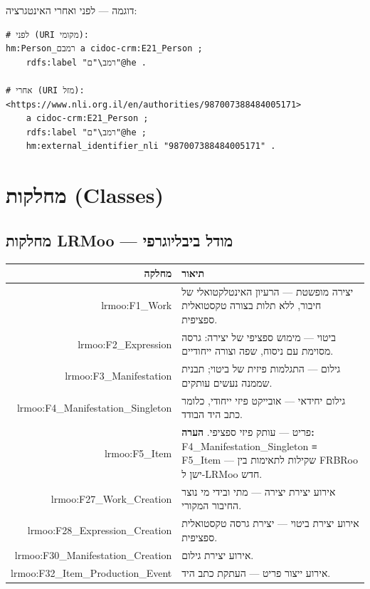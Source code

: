 \textcolor{newaddition}{דוגמה — לפני ואחרי האינטגרציה:}

\begin{verbatim}
# לפני (URI מקומי):
hm:Person_רמבם a cidoc-crm:E21_Person ;
    rdfs:label "רמב\"ם"@he .

# אחרי (URI מזל):
<https://www.nli.org.il/en/authorities/987007388484005171>
    a cidoc-crm:E21_Person ;
    rdfs:label "רמב\"ם"@he ;
    hm:external_identifier_nli "987007388484005171" .
\end{verbatim}

\newpage

\section{מחלקות (Classes)}

\subsection{מחלקות LRMoo — מודל ביבליוגרפי}

\begin{longtable}{|r|p{10cm}|}
\hline
\textbf{מחלקה} & \textbf{תיאור} \\
\hline
\endhead

lrmoo:F1\_Work & 
יצירה מופשטת — הרעיון האינטלקטואלי של חיבור, ללא תלות בצורה טקסטואלית ספציפית.\\
\hline

lrmoo:F2\_Expression & 
ביטוי — מימוש ספציפי של יצירה: גרסה מסוימת עם ניסוח, שפה וצורה ייחודיים.\\
\hline

lrmoo:F3\_Manifestation & 
גילום — התגלמות פיזית של ביטוי; תבנית שממנה נעשים עותקים.\\
\hline

lrmoo:F4\_Manifestation\_Singleton & 
גילום יחידאי — אובייקט פיזי ייחודי, כלומר כתב היד הבודד.\\
\hline

lrmoo:F5\_Item & 
פריט — עותק פיזי ספציפי. \textbf{הערה:} \textenglish{F4\_Manifestation\_Singleton ≡ F5\_Item} — שקילות לתאימות בין \textenglish{FRBRoo} ישן ל-\textenglish{LRMoo} חדש.\\
\hline

lrmoo:F27\_Work\_Creation & 
אירוע יצירת יצירה — מתי ובידי מי נוצר החיבור המקורי.\\
\hline

lrmoo:F28\_Expression\_Creation & 
אירוע יצירת ביטוי — יצירת גרסה טקסטואלית ספציפית.\\
\hline

lrmoo:F30\_Manifestation\_Creation & 
אירוע יצירת גילום.\\
\hline

lrmoo:F32\_Item\_Production\_Event & 
אירוע ייצור פריט — העתקת כתב היד.\\
\hline
\end{longtable}

